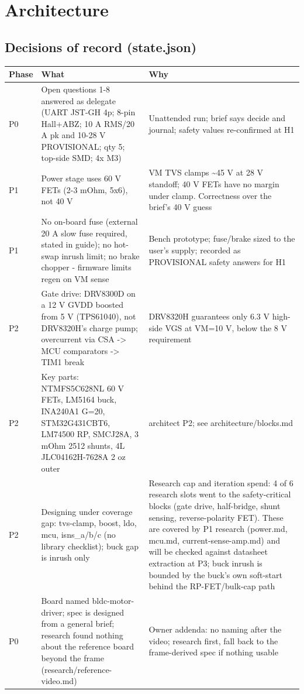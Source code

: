 \documentclass[11pt,a4paper]{article}
\begin{document}
\section{Architecture}
\subsection*{Decisions of record (state.json)}
{\small
\begin{longtable}{lp{5.2cm}p{7.2cm}}
\toprule
\textbf{Phase} & \textbf{What} & \textbf{Why} \\
\midrule
\endhead
P0 & Open questions 1-8 answered as delegate (UART JST-GH 4p; 8-pin Hall+ABZ; 10 A RMS/20 A pk and 10-28 V PROVISIONAL; qty 5; top-side SMD; 4x M3) & Unattended run; brief says decide and journal; safety values re-confirmed at H1 \\
P1 & Power stage uses 60 V FETs (2-3 mOhm, 5x6), not 40 V & VM TVS clamps \textasciitilde{}45 V at 28 V standoff; 40 V FETs have no margin under clamp. Correctness over the brief's 40 V guess \\
P1 & No on-board fuse (external 20 A slow fuse required, stated in guide); no hot-swap inrush limit; no brake chopper - firmware limits regen on VM sense & Bench prototype; fuse/brake sized to the user's supply; recorded as PROVISIONAL safety answers for H1 \\
P2 & Gate drive: DRV8300D on a 12 V GVDD boosted from 5 V (TPS61040), not DRV8320H's charge pump; overcurrent via CSA -\textgreater{} MCU comparators -\textgreater{} TIM1 break & DRV8320H guarantees only 6.3 V high-side VGS at VM=10 V, below the 8 V requirement \\
P2 & Key parts: NTMFS5C628NL 60 V FETs, LM5164 buck, INA240A1 G=20, STM32G431CBT6, LM74500 RP, SMCJ28A, 3 mOhm 2512 shunts, 4L JLC04162H-7628A 2 oz outer & architect P2; see architecture/blocks.md \\
P2 & Designing under coverage gap: tvs-clamp, boost, ldo, mcu, isns\_a/b/c (no library checklist); buck gap is inrush only & Research cap and iteration spend: 4 of 6 research slots went to the safety-critical blocks (gate drive, half-bridge, shunt sensing, reverse-polarity FET). These are covered by P1 research (power.md, mcu.md, current-sense-amp.md) and will be checked against datasheet extraction at P3; buck inrush is bounded by the buck's own soft-start behind the RP-FET/bulk-cap path \\
P0 & Board named bldc-motor-driver; spec is designed from a general brief; research found nothing about the reference board beyond the frame (research/reference-video.md) & Owner addenda: no naming after the video; research first, fall back to the frame-derived spec if nothing usable \\

\end{longtable}}
\end{document}
